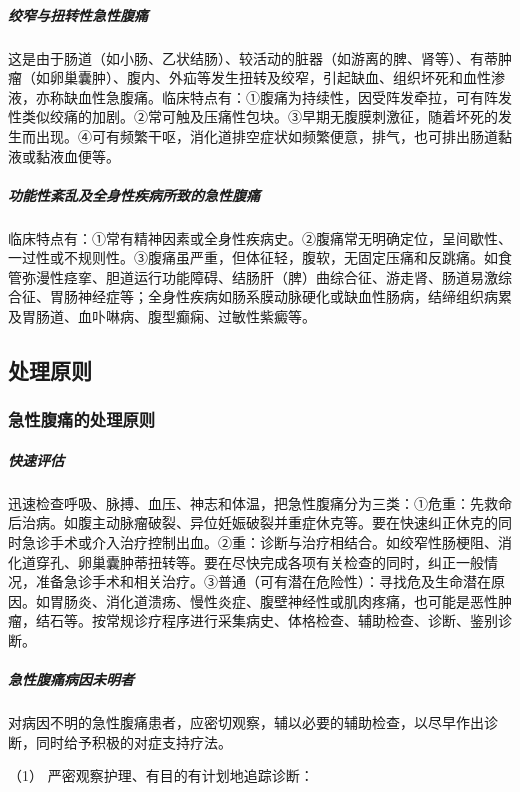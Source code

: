 \subparagraph{绞窄与扭转性急性腹痛}

这是由于肠道（如小肠、乙状结肠）、较活动的脏器（如游离的脾、肾等）、有蒂肿瘤（如卵巢囊肿）、腹内、外疝等发生扭转及绞窄，引起缺血、组织坏死和血性渗液，亦称缺血性急腹痛。临床特点有：①腹痛为持续性，因受阵发牵拉，可有阵发性类似绞痛的加剧。②常可触及压痛性包块。③早期无腹膜刺激征，随着坏死的发生而出现。④可有频繁干呕，消化道排空症状如频繁便意，排气，也可排出肠道黏液或黏液血便等。

\subparagraph{功能性紊乱及全身性疾病所致的急性腹痛}

临床特点有：①常有精神因素或全身性疾病史。②腹痛常无明确定位，呈间歇性、一过性或不规则性。③腹痛虽严重，但体征轻，腹软，无固定压痛和反跳痛。如食管弥漫性痉挛、胆道运行功能障碍、结肠肝（脾）曲综合征、游走肾、肠道易激综合征、胃肠神经症等；全身性疾病如肠系膜动脉硬化或缺血性肠病，结缔组织病累及胃肠道、血卟啉病、腹型癫痫、过敏性紫癜等。

\subsection{处理原则}

\subsubsection{急性腹痛的处理原则}

\subparagraph{快速评估}

迅速检查呼吸、脉搏、血压、神志和体温，把急性腹痛分为三类：①危重：先救命后治病。如腹主动脉瘤破裂、异位妊娠破裂并重症休克等。要在快速纠正休克的同时急诊手术或介入治疗控制出血。②重：诊断与治疗相结合。如绞窄性肠梗阻、消化道穿孔、卵巢囊肿蒂扭转等。要在尽快完成各项有关检查的同时，纠正一般情况，准备急诊手术和相关治疗。③普通（可有潜在危险性）：寻找危及生命潜在原因。如胃肠炎、消化道溃疡、慢性炎症、腹壁神经性或肌肉疼痛，也可能是恶性肿瘤，结石等。按常规诊疗程序进行采集病史、体格检查、辅助检查、诊断、鉴别诊断。

\subparagraph{急性腹痛病因未明者}

对病因不明的急性腹痛患者，应密切观察，辅以必要的辅助检查，以尽早作出诊断，同时给予积极的对症支持疗法。

\hypertarget{text00026.htmlux5cux23CHP1-10-3-1-2-1}{}
（1） 严密观察护理、有目的有计划地追踪诊断：

